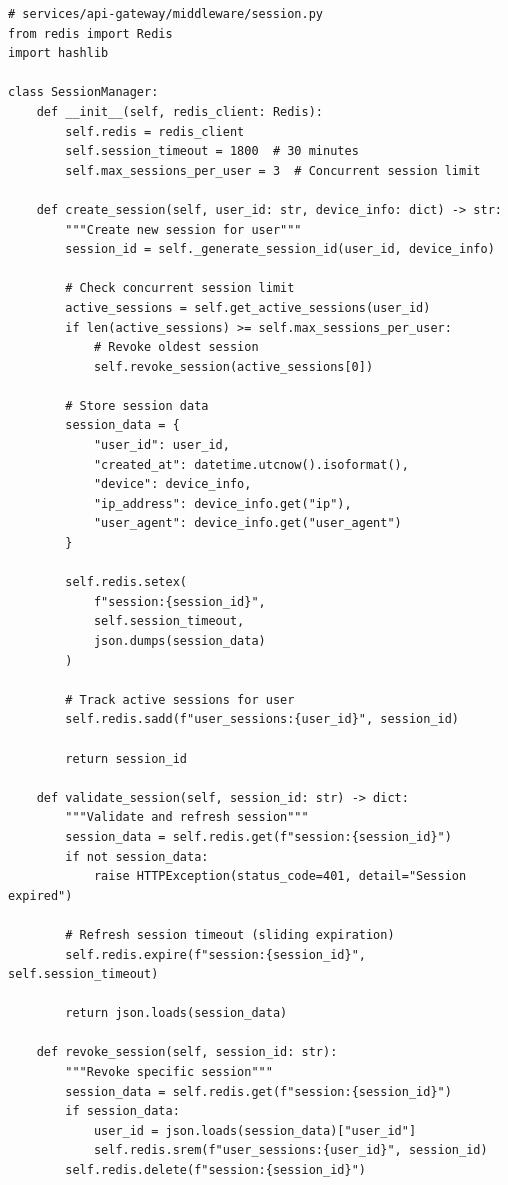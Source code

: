 \begin{lstlisting}[style=pythonstyle]
# services/api-gateway/middleware/session.py
from redis import Redis
import hashlib

class SessionManager:
    def __init__(self, redis_client: Redis):
        self.redis = redis_client
        self.session_timeout = 1800  # 30 minutes
        self.max_sessions_per_user = 3  # Concurrent session limit
    
    def create_session(self, user_id: str, device_info: dict) -> str:
        """Create new session for user"""
        session_id = self._generate_session_id(user_id, device_info)
        
        # Check concurrent session limit
        active_sessions = self.get_active_sessions(user_id)
        if len(active_sessions) >= self.max_sessions_per_user:
            # Revoke oldest session
            self.revoke_session(active_sessions[0])
        
        # Store session data
        session_data = {
            "user_id": user_id,
            "created_at": datetime.utcnow().isoformat(),
            "device": device_info,
            "ip_address": device_info.get("ip"),
            "user_agent": device_info.get("user_agent")
        }
        
        self.redis.setex(
            f"session:{session_id}",
            self.session_timeout,
            json.dumps(session_data)
        )
        
        # Track active sessions for user
        self.redis.sadd(f"user_sessions:{user_id}", session_id)
        
        return session_id
    
    def validate_session(self, session_id: str) -> dict:
        """Validate and refresh session"""
        session_data = self.redis.get(f"session:{session_id}")
        if not session_data:
            raise HTTPException(status_code=401, detail="Session expired")
        
        # Refresh session timeout (sliding expiration)
        self.redis.expire(f"session:{session_id}", self.session_timeout)
        
        return json.loads(session_data)
    
    def revoke_session(self, session_id: str):
        """Revoke specific session"""
        session_data = self.redis.get(f"session:{session_id}")
        if session_data:
            user_id = json.loads(session_data)["user_id"]
            self.redis.srem(f"user_sessions:{user_id}", session_id)
        self.redis.delete(f"session:{session_id}")
\end{lstlisting}


